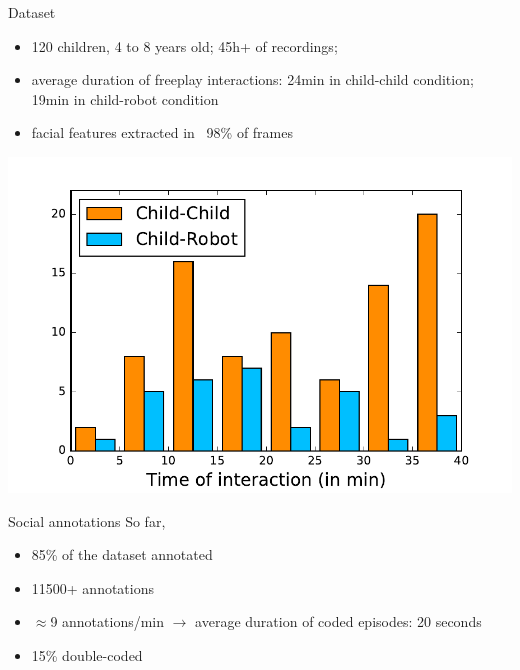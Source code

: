 \documentclass[compress]{beamer}
\begin{document}
\begin{frame}{Dataset}
    \begin{itemize}
        \item 120 children, 4 to 8 years old; 45h+ of recordings;
     \item average duration of freeplay interactions: 24min in child-child
         condition; 19min in child-robot condition
     \item facial features extracted in ~98\% of frames
    \end{itemize}

    \begin{center}
        \includegraphics[width=0.5\linewidth]{freeplay/durations}
    \end{center}
\end{frame}




\begin{frame}{Social annotations}
    So far,
    \begin{itemize}
        \item 85\% of the dataset annotated
        \item 11500+ annotations
        \item $\approx$9 annotations/min $\rightarrow$ average duration of coded
            episodes: 20 seconds
        \item 15\% double-coded
    \end{itemize}
\end{frame}


\end{document}
